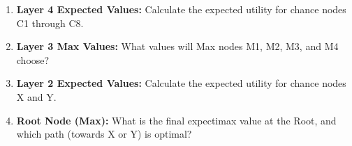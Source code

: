 \documentclass[11pt, letterpaper]{article}
\begin{document}
\begin{enumerate}[resume]
    \item \textbf{Layer 4 Expected Values:} Calculate the expected utility for chance nodes C1 through C8.
    \vspace{4cm}

    \item \textbf{Layer 3 Max Values:} What values will Max nodes M1, M2, M3, and M4 choose?
    \vspace{2cm}

    \item \textbf{Layer 2 Expected Values:} Calculate the expected utility for chance nodes X and Y.
    \vspace{2.5cm}

    \item \textbf{Root Node (Max):} What is the final expectimax value at the Root, and which path (towards X or Y) is optimal?
    \vspace{2cm}
\end{enumerate}
\end{document}
